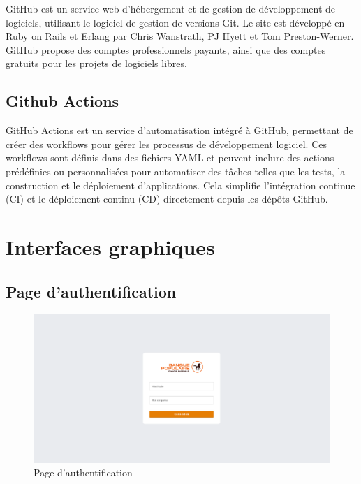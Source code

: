 \noindent GitHub est un service web d'hébergement et de gestion de développement de logiciels, utilisant le logiciel de gestion de versions Git. Le site est développé en Ruby on Rails et Erlang par Chris Wanstrath, PJ Hyett et Tom Preston-Werner. GitHub propose des comptes professionnels payants, ainsi que des comptes gratuits pour les projets de logiciels libres. 

\subsection{Github Actions}


\noindent GitHub Actions est un service d'automatisation intégré à GitHub, permettant de créer des workflows pour gérer les processus de développement logiciel. Ces workflows sont définis dans des fichiers YAML et peuvent inclure des actions prédéfinies ou personnalisées pour automatiser des tâches telles que les tests, la construction et le déploiement d'applications. Cela simplifie l'intégration continue (CI) et le déploiement continu (CD) directement depuis les dépôts GitHub.

\clearpage


\section{Interfaces graphiques}

\subsection{Page d'authentification}

\begin{figure}[H]
    \centering
    \includegraphics[height=.65\textwidth, angle=90]{images/guis/login.png}
    \caption{Page d'authentification}
\end{figure}


